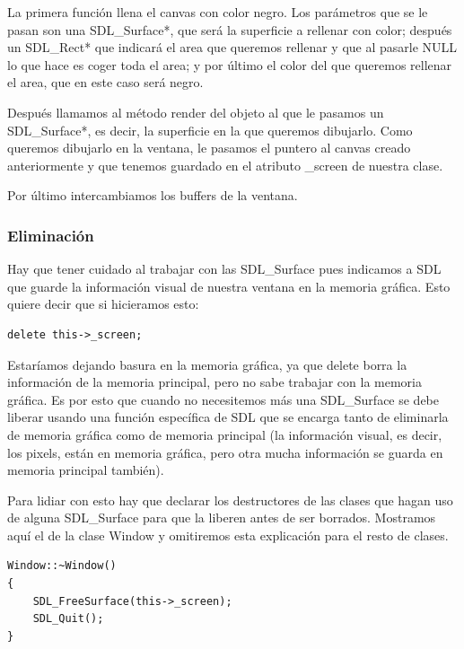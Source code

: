 \documentclass[parskip=half*]{scrartcl}
\begin{document}
				La primera funci\'on llena el canvas con color negro. Los par\'ametros que se le pasan son una SDL\_Surface*, que ser\'a la superficie a rellenar con color; despu\'es un SDL\_Rect* que indicar\'a el area que queremos rellenar y que al pasarle NULL lo que hace es coger toda el area; y por \'ultimo el color del que queremos rellenar el area, que en este caso ser\'a negro. 

				Despu\'es llamamos al m\'etodo render del objeto al que le pasamos un SDL\_Surface*, es decir, la superficie en la que queremos dibujarlo. Como queremos dibujarlo en la ventana, le pasamos el puntero al canvas creado anteriormente y que tenemos guardado en el atributo \_screen de nuestra clase.

				Por \'ultimo intercambiamos los buffers de la ventana.

			\subsubsection{Eliminaci\'on}
				Hay que tener cuidado al trabajar con las SDL\_Surface pues indicamos a SDL que guarde la informaci\'on visual de nuestra ventana en la memoria gr\'afica. Esto quiere decir que si hicieramos esto:

				\begin{verbatim}
delete this->_screen;
				\end{verbatim}

				Estar\'iamos dejando basura en la memoria gr\'afica, ya que delete borra la informaci\'on de la memoria principal, pero no sabe trabajar con la memoria gr\'afica. Es por esto que cuando no necesitemos m\'as una SDL\_Surface se debe liberar usando una funci\'on espec\'ifica de SDL que se encarga tanto de eliminarla de memoria gr\'afica como de memoria principal (la informaci\'on visual, es decir, los pixels, est\'an en memoria gr\'afica, pero otra mucha informaci\'on se guarda en memoria principal tambi\'en).

				Para lidiar con esto hay que declarar los destructores de las clases que hagan uso de alguna SDL\_Surface para que la liberen antes de ser borrados. Mostramos aqu\'i el de la clase Window y omitiremos esta explicaci\'on para el resto de clases.

				\begin{verbatim}
Window::~Window()
{
    SDL_FreeSurface(this->_screen);
    SDL_Quit();
}
				\end{verbatim}
\end{document}
